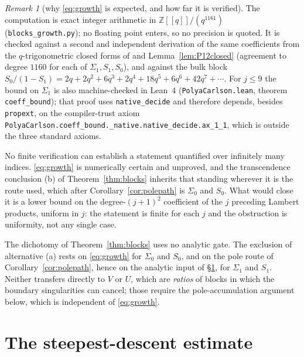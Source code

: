 \documentclass[11pt]{article}
\theoremstyle{plain}
\theoremstyle{definition}
\theoremstyle{remark}
\newtheorem{remark}[theorem]{Remark}
\newcommand{\Z}{\mathbb{Z}}
\begin{document}
\begin{remark}[why \eqref{eq:growth} is expected, and how far it is verified]
The computation is exact integer arithmetic in $\Z[[q]]/(q^{1161})$
(\texttt{blocks\_growth.py}); no floating point enters, so no precision is quoted. It is checked
against a second and independent derivation of the same coefficients from the $q$-trigonometric
closed forms of {\cite[Proposition \textup{prop:qtrig}]{Bonfioli2026bA}} and Lemma~\ref{lem:P12closed} (agreement to degree
$1160$ for each of $\Sigma_1,S_1,S_0$), and against the bulk block
$S_0/(1-S_1)=2q+2q^2+6q^3+2q^4+18q^5+6q^6+42q^7+\cdots$. For $j\le9$ the bound on $\Sigma_1$ is
also machine-checked in Lean~4 (\texttt{PolyaCarlson.lean}, theorem \texttt{coeff\_bound}); that
proof uses \texttt{native\_decide} and therefore depends, besides \texttt{propext}, on the
compiler-trust axiom \texttt{PolyaCarlson.coeff\_bound.\_native.native\_decide.ax\_1\_1}, which is
outside the three standard axioms.

No finite verification can establish a statement quantified over infinitely many indices.
\eqref{eq:growth} is numerically certain and unproved, and the transcendence conclusion
\textup{(b)} of Theorem~\ref{thm:blocks} inherits that standing wherever it is the route used,
which after Corollary~\ref{cor:polepath} is $\Sigma_0$ and $S_0$. What would close it is a lower
bound on the degree-$(j+1)^2$ coefficient of the $j$ preceding Lambert products, uniform in $j$:
the statement is finite for each $j$ and the obstruction is uniformity, not any single case.
\end{remark}

The dichotomy of Theorem~\ref{thm:blocks} uses no analytic gate. The exclusion of alternative
\textup{(a)} rests on \eqref{eq:growth} for $\Sigma_0$ and $S_0$, and on the pole route of
Corollary~\ref{cor:polepath}, hence on the analytic input of \S\ref{sec:sd}, for $\Sigma_1$ and
$S_1$. Neither transfers directly
to $V$ or $U$, which are \emph{ratios} of blocks in which the boundary singularities can cancel;
those require the pole-accumulation argument below, which is independent of \eqref{eq:growth}.

\section{The steepest-descent estimate}\label{sec:sd}
\end{document}
